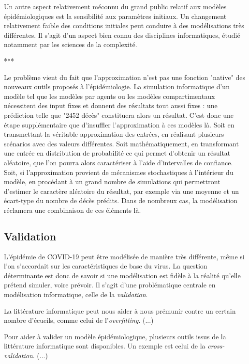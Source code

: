 \documentclass[review]{elsarticle}
\begin{document}
Un autre aspect relativement méconnu du grand public relatif aux modèles épidémiologiques est la sensibilité aux paramètres initiaux. Un changement relativement faible des conditions initiales peut conduire à des modélisations très différentes. Il s'agit d'un aspect bien connu des disciplines informatiques, étudié notamment par les sciences de la complexité. 

***

Le problème vient du fait que l'approximation n'est pas une fonction "native" des nouveaux outils proposés à l'épidémiologie. La simulation informatique d'un modèle tel que les modèles par agents ou les modèles compartimentaux nécessitent des input fixes et donnent des résultats tout aussi fixes : une prédiction telle que "2452 décès" constituera alors un résultat. C'est donc une étape supplémentaire que d’insuffler l'approximation à ces modèles là. Soit en transmettant la véritable approximation des entrées, en réalisant plusieurs scénarios avec des valeurs différentes. Soit mathématiquement, en transformant une entrée en distribution de probabilité ce qui permet d'obtenir un résultat aléatoire, que l'on pourra alors caractériser à l'aide d'intervalles de confiance. Soit, si l'approximation provient de mécanismes stochastiques à l'intérieur du modèle, en procédant à un grand nombre de simulations qui permettront d'estimer le caractère aléatoire du résultat, par exemple via une moyenne et un écart-type du nombre de décès prédits. Dans de nombreux cas, la modélisation réclamera une combinaison de ces éléments là.

\subsection{Validation}

L'épidémie de COVID-19 peut être modélisée de manière très différente, même si l'on s'accordait sur les caractéristiques de base du virus. La question déterminante est donc de savoir si une modélisation est fidèle à la réalité qu'elle prétend simuler, voire prévoir. Il s'agit d'une problématique centrale en modélisation informatique, celle de la \textit{validation}.

La littérature informatique peut nous aider à nous prémunir contre un certain nombre d'écueils, comme celui de l'\textit{overfitting}. (...)

Pour aider à valider un modèle épidémiologique, plusieurs outils issus de la littérature informatique sont disponibles. Un exemple est celui de la \textit{cross-validation}. (...)
\end{document}
